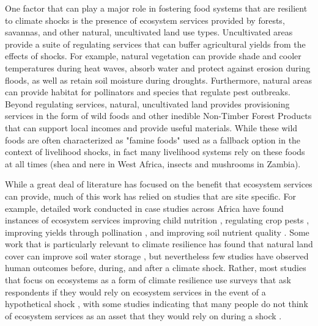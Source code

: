 \documentclass{article}
\begin{document}
One factor that can play a major role in fostering food systems that are resilient to climate shocks is the presence of ecosystem services provided by forests, savannas, and other natural, uncultivated land use types.  Uncultivated areas provide a suite of regulating services that can buffer agricultural yields from the effects of shocks.  For example, natural vegetation can provide shade and cooler temperatures during heat waves, absorb water and protect against erosion during floods, as well as retain soil moisture during droughts.  Furthermore, natural areas can provide habitat for pollinators and species that regulate pest outbreaks.  Beyond regulating services, natural, uncultivated land provides provisioning services in the form of wild foods and other inedible Non-Timber Forest Products that can support local incomes and provide useful materials.  While these wild foods are often characterized as "famine foods" used as a fallback option in the context of livelihood shocks, in fact many livelihood systems rely on these foods at all times (shea and nere in West Africa, insects and mushrooms in Zambia).

While a great deal of literature has focused on the benefit that ecosystem services can provide, much of this work has relied on studies that are site specific.  For example, detailed work conducted in case studies across Africa have found instances of ecosystem services improving child nutrition \cite{Golden2011}, regulating crop pests \cite{Girma2000}, improving yields through pollination \cite{Gemmill-Herren2008, Munyuli2012}, and improving soil nutrient quality \cite{Sileshi2012, Boffa2000, Siriri2009}.  Some work that is particularly relevant to climate resilience has found that natural land cover can improve soil water storage \cite{Siriri2013, Lott2009}, but nevertheless few studies have observed human outcomes before, during, and after a climate shock.  Rather, most studies that focus on ecosystems as a form of climate resilience use surveys that ask respondents if they would rely on ecosystem services in the event of a hypothetical shock \cite{Robledo2012}, with some studies indicating that many people do not think of ecosystem services as an asset that they would rely on during a shock \cite{Wunder2014}.
\end{document}
